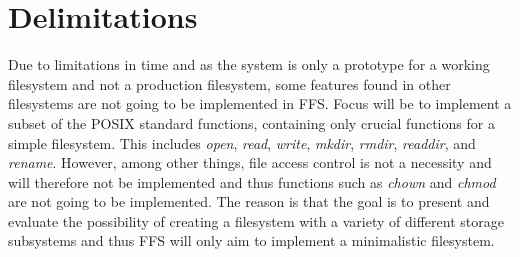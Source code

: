 \section{Delimitations} %

Due to limitations in time and as the system is only a prototype for a working filesystem and not a production filesystem, some features found in other filesystems are not going to be implemented in FFS. Focus will be to implement a subset of the POSIX standard functions, containing only crucial functions for a simple filesystem. This includes \textit{open}, \textit{read}, \textit{write}, \textit{mkdir}, \textit{rmdir}, \textit{readdir}, and \textit{rename}. However, among other things, file access control is not a necessity and will therefore not be implemented and thus functions such as \textit{chown} and \textit{chmod} are not going to be implemented. The reason is that the goal is to present and evaluate the possibility of creating a filesystem with a variety of different storage subsystems and thus FFS will only aim to implement a minimalistic filesystem. 